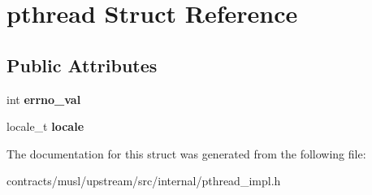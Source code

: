 \hypertarget{structpthread}{}\section{pthread Struct Reference}
\label{structpthread}
\subsection*{Public Attributes}
\begin{DoxyCompactItemize}
\item 
\mbox{\label{structpthread_a149f13a61e7001916992595be59a8068}} 
int {\bfseries errno\+\_\+val}
\item 
\mbox{\label{structpthread_a564e1697afb0ae2d8baa2e1d49d0c861}} 
locale\+\_\+t {\bfseries locale}
\end{DoxyCompactItemize}


The documentation for this struct was generated from the following file\+:\begin{DoxyCompactItemize}
\item 
contracts/musl/upstream/src/internal/pthread\+\_\+impl.\+h\end{DoxyCompactItemize}

